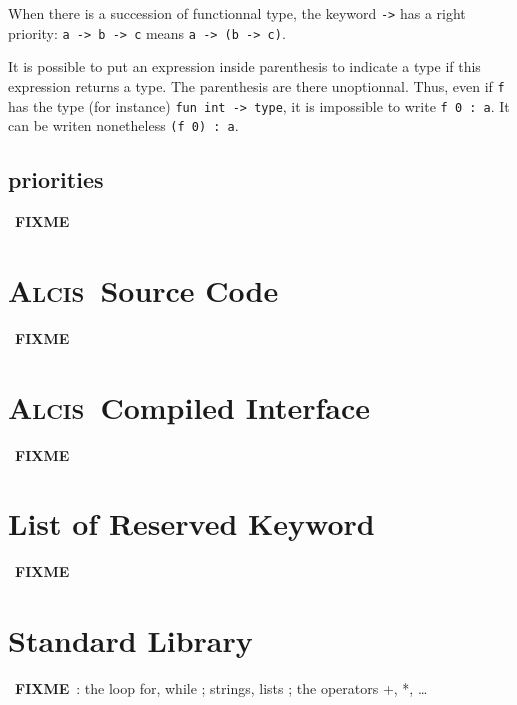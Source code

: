 \documentclass{article}
\newcommand{\Alcis}{\textsc{Alcis}~}
\newcommand{\FIXME}{~\textbf{FIXME}~}
\begin{document}
When there is a succession of functionnal type, the keyword \lstinline$->$ has a right priority: \lstinline$a -> b -> c$ means \lstinline$a -> (b -> c)$.

It is possible to put an expression inside parenthesis to indicate a type if this expression returns a type. The parenthesis are there unoptionnal.
Thus, even if \lstinline$f$ has the type (for instance) \lstinline$fun int -> type$, it is impossible to write \lstinline$f 0 : a$.
It can be writen nonetheless \lstinline$(f 0) : a$.

\subsection{priorities}

\FIXME

\section{\Alcis Source Code}

\FIXME

\section{\Alcis Compiled Interface}

\FIXME

\section{List of Reserved Keyword}

\FIXME

\section{Standard Library}

\FIXME: the loop for, while ; strings, lists ; the operators +, *, \ldots
\end{document}
